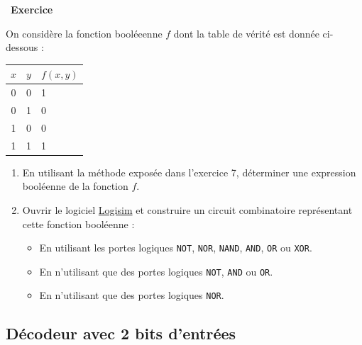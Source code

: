 \documentclass[
  11pt,
]{article}
\newcommand{\passthrough}[1]{#1}
\providecommand{\tightlist}{%
  \setlength{\itemsep}{0pt}\setlength{\parskip}{0pt}}
\newcounter{exo}
\newenvironment{exercice}[1]
{\par \medskip   \addtocounter{exo}{1} \noindent  
\begin{bclogo}[arrondi =0.1,   noborder = true, logo=\bccrayon, marge=4]{~\textbf{Exercice} \textbf{\theexo} {\itshape #1} }  \par}
{
\end{bclogo}
 \par \bigskip }
\newcounter{def}
\newcounter{logi}
\begin{document}
\begin{exercice}{}

On considère la fonction booléeenne \(f\) dont la table de vérité est
donnée ci-dessous :

\begin{longtable}[]{@{}cll@{}}
\toprule
\(x\) & \(y\) & \(f(x, y)\)\tabularnewline
\midrule
\endhead
0 & 0 & 1\tabularnewline
0 & 1 & 0\tabularnewline
1 & 0 & 0\tabularnewline
1 & 1 & 1\tabularnewline
\bottomrule
\end{longtable}

\begin{enumerate}
\def\labelenumi{\arabic{enumi}.}
\item
  En utilisant la méthode exposée dans l'exercice 7, déterminer une
  expression booléenne de la fonction \(f\).
\item
  Ouvrir le logiciel \href{http://www.cburch.com/logisim/}{Logisim} et
  construire un circuit combinatoire représentant cette fonction
  booléenne :

  \begin{itemize}
  \tightlist
  \item
    En utilisant les portes logiques \passthrough{\lstinline!NOT!},
    \passthrough{\lstinline!NOR!}, \passthrough{\lstinline!NAND!},
    \passthrough{\lstinline!AND!}, \passthrough{\lstinline!OR!} ou
    \passthrough{\lstinline!XOR!}.
  \item
    En n'utilisant que des portes logiques
    \passthrough{\lstinline!NOT!}, \passthrough{\lstinline!AND!} ou
    \passthrough{\lstinline!OR!}.
  \item
    En n'utilisant que des portes logiques
    \passthrough{\lstinline!NOR!}.
  \end{itemize}
\end{enumerate}

\end{exercice}

\hypertarget{duxe9codeur-avec-2-bits-dentruxe9es}{%
\subsection{Décodeur avec 2 bits
d'entrées}\label{duxe9codeur-avec-2-bits-dentruxe9es}}
\end{document}
